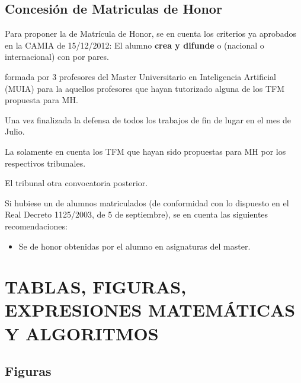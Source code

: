 {{		
		\subsection{Concesión de Matriculas de Honor}
		\noindent Para proponer la  de Matrícula de Honor, se  en cuenta los criterios ya aprobados en la CAMIA de 15/12/2012: El alumno {\bf crea y difunde}  o  (nacional o internacional) con  por pares.
		
		formada por 3 profesores del Master Universitario en Inteligencia Artificial (MUIA) para la  aquellos profesores que hayan tutorizado alguna de los TFM propuesta para MH.
		
		Una vez finalizada la defensa de todos los trabajos de fin de  lugar en el mes de Julio. 
		
		La  solamente  en cuenta los TFM que hayan sido propuestas para MH por los respectivos tribunales.
		
		El tribunal otra convocatoria posterior.
		
		Si hubiese un  de alumnos matriculados (de conformidad con lo dispuesto en el Real Decreto 1125/2003, de 5 de septiembre), se  en cuenta las siguientes recomendaciones:
		
		\begin{itemize}
			\item Se  de honor obtenidas por el alumno en asignaturas del master.
		\end{itemize}
		
		
		\section{TABLAS, FIGURAS, EXPRESIONES MATEMÁTICAS Y ALGORITMOS}
		
		\subsection{Figuras}
		
}}
